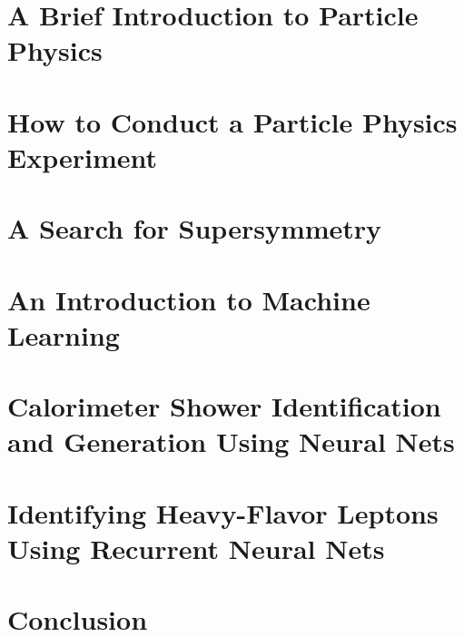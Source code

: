 \documentclass[draftthesis,fancy,edeposit]{uiuc_thesis_template}
\begin{document}




\tableofcontents
\listoftables
\listoffigures


\mainmatter

\part{A Brief Introduction to Particle Physics}




\part{How to Conduct a Particle Physics Experiment}



\part{A Search for Supersymmetry}





\part{An Introduction to Machine Learning}


\part{Calorimeter Shower Identification and Generation Using Neural Nets}


\part{Identifying  Heavy-Flavor  Leptons  Using  Recurrent  Neural Nets}


\part{Conclusion}


\clearpage
\appendix









\backmatter

\printbibliography
\end{document}
